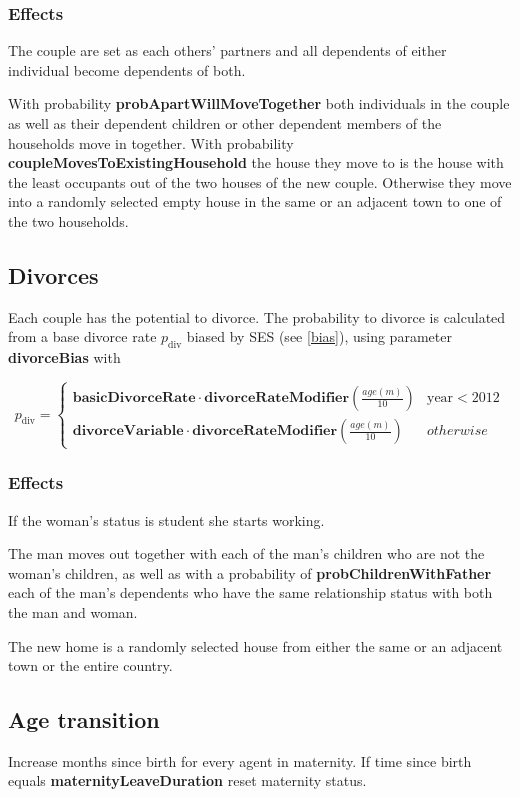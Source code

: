 \documentclass{article}
\begin{document}
\subsubsection*{Effects}

The couple are set as each others' partners and all dependents of either individual become dependents of both.

With probability \textbf{probApartWillMoveTogether} both individuals in the couple as well as their dependent children or other dependent members of the households move in together. With probability \textbf{coupleMovesToExistingHousehold} the house they move to is the house with the least occupants out of the two houses of the new couple.  Otherwise they move into a randomly selected empty house in the same or an adjacent town to one of the two households.

 
\subsection{Divorces} 

Each couple has the potential to divorce. The probability to divorce is calculated from a base divorce rate $p_\textrm{div}$ biased by SES (see \ref{bias}), using parameter \textbf{divorceBias} with 

\[
    p_\textrm{div}  =  \left\{ 
        \begin{array}{ll}
             \mathbf{basicDivorceRate} \cdot \mathbf{divorceRateModifier} ( \frac{age(m)}{10}) & \mathrm{year} < 2012  \\
            \mathbf{divorceVariable} \cdot   \mathbf{divorceRateModifier} ( \frac{age(m)}{10}) & otherwise  
        \end{array}
    \right. 
\]
\subsubsection*{Effects}

If the woman's status is student she starts working.

The man moves out together with each of the man's children who are not the woman's children, as well as with a probability of \textbf{probChildrenWithFather} each of the man's dependents who have the same relationship status with both the man and woman.

The new home is a randomly selected house from either the same or an adjacent town or the entire country. 

\subsection{Age transition}
Increase months since birth for every agent in maternity. If time since
birth equals \textbf{maternityLeaveDuration} reset maternity status. 
\end{document}
